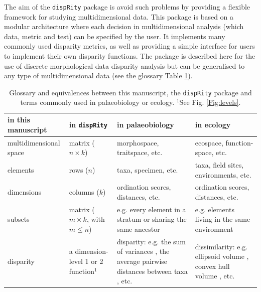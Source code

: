 \documentclass[12pt,letterpaper]{article}
\newcommand{\disp}{\texttt{dispRity} }
\begin{document}
The aim of the \disp package is avoid such problems by providing a flexible framework for studying multidimensional data.
This package is based on a modular architecture where each decision in multidimensional analysis (which data, metric and test) can be specified by the user.
It implements many commonly used disparity metrics, as well as providing a simple interface for users to implement their own disparity functions.
The package is described here for the use of discrete morphological data disparity analysis but can be generalised to any type of multidimensional data (see the glossary Table \ref{Tab:terms}).

\begin{landscape}
\begin{table}
    \begin{tabular}{p{4cm}p{5cm}p{6cm}p{6cm}}
        \hline
        \textbf{in this manuscript} & \textbf{in} \texttt{\textbf{dispRity}} & \textbf{in palaeobiology} & \textbf{in ecology} \\ 
        \hline
        multidimensional space & matrix ($n\times k$) & morphospace, traitspace, etc. & ecospace, function-space, etc. \\
        \hline
        elements & rows ($n$) & taxa, specimen, etc. & taxa, field sites, environments, etc. \\
        \hline
        dimensions & columns ($k$) & ordination scores, distances, etc. & ordination scores, distances, etc. \\
        \hline
        subsets & matrix ($m \times k$, with $m \leq n$) & e.g. every element in a stratum or sharing the same ancestor & e.g. elements living in the same environment \\
        \hline
        disparity & a dimension-level 1 or 2 function$^1$ & disparity: e.g. the sum of variances \citep{Wills2001}, the average pairwise distances between taxa \citep{Foote01071994}, etc. & dissimilarity: e.g. ellipsoid volume \citep{DonohueDim}, convex hull volume \citep{cornwell2006trait}, etc. \\
        \hline
    \end{tabular}
    \caption{Glossary and equivalences between this manuscript, the \texttt{dispRity} package and terms commonly used in palaeobiology or ecology. $^1$See Fig. \ref{Fig:levels}.}
    \label{Tab:terms}
\end{table}
\end{landscape}
\end{document}
